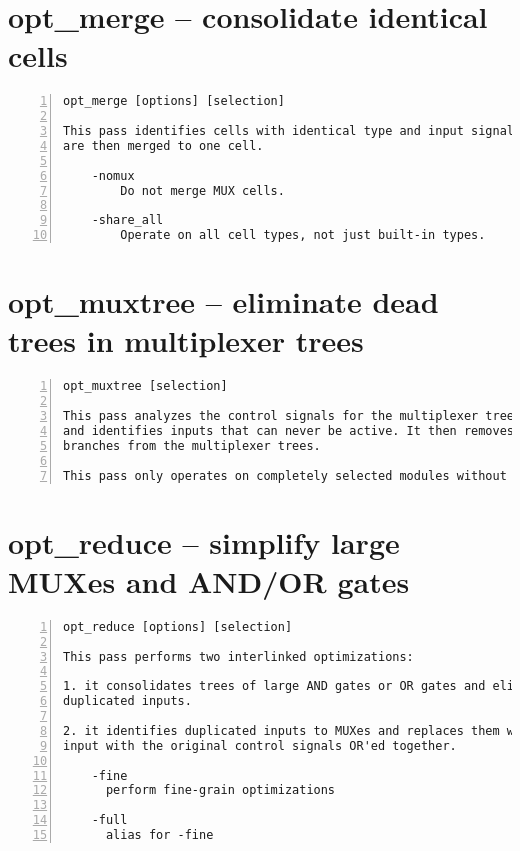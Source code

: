 \section{opt\_merge -- consolidate identical cells}
\label{cmd:opt_merge}
\begin{lstlisting}[numbers=left,frame=single]
    opt_merge [options] [selection]

This pass identifies cells with identical type and input signals. Such cells
are then merged to one cell.

    -nomux
        Do not merge MUX cells.

    -share_all
        Operate on all cell types, not just built-in types.
\end{lstlisting}

\section{opt\_muxtree -- eliminate dead trees in multiplexer trees}
\label{cmd:opt_muxtree}
\begin{lstlisting}[numbers=left,frame=single]
    opt_muxtree [selection]

This pass analyzes the control signals for the multiplexer trees in the design
and identifies inputs that can never be active. It then removes this dead
branches from the multiplexer trees.

This pass only operates on completely selected modules without processes.
\end{lstlisting}

\section{opt\_reduce -- simplify large MUXes and AND/OR gates}
\label{cmd:opt_reduce}
\begin{lstlisting}[numbers=left,frame=single]
    opt_reduce [options] [selection]

This pass performs two interlinked optimizations:

1. it consolidates trees of large AND gates or OR gates and eliminates
duplicated inputs.

2. it identifies duplicated inputs to MUXes and replaces them with a single
input with the original control signals OR'ed together.

    -fine
      perform fine-grain optimizations

    -full
      alias for -fine
\end{lstlisting}


